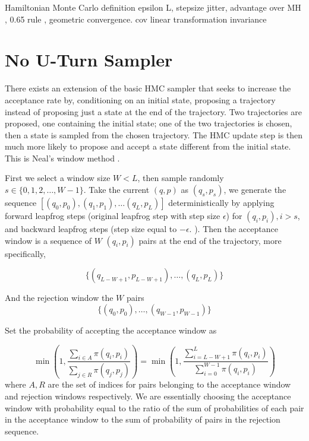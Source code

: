 \documentclass[]{report}
\begin{document}
Hamiltonian Monte Carlo 
definition epsilon L, stepsize jitter, advantage over MH , 0.65 rule , geometric convergence. cov linear transformation invariance 


\section{No U-Turn Sampler}


There exists an extension of the basic HMC sampler that seeks to increase the acceptance
rate by, conditioning on an initial state, proposing a trajectory instead of proposing just a state at the end
of the trajectory. Two trajectories are proposed, one containing the initial state; one
of the two trajectories is chosen, then a state is sampled from the chosen
trajectory. The HMC update step is then much more likely to propose and accept
a state different from the initial state. This is Neal's window
method \cite{neal1992improved}. 

First we select a window size $W < L$, then sample randomly $s \in \{0, 1,2 , \dots , W -1 \}$. Take the current $(q,p)$ as $(q_s, p_s)$, we generate the sequence $[(q_0,p_0),(q_1, p_1), \dots (q_L,p_L)]$ deterministically by applying forward leapfrog steps (original leapfrog step with step size $\epsilon$) for $(q_i,p_i), i > s $, and backward leapfrog steps (step size equal to $-\epsilon$. ). 
Then the acceptance window is a sequence of $W$ $(q_i,p_i)$ pairs at the end of the trajectory, more specifically,

\[ \{(q_{L-W+1},p_{L-W+1}), \dots , (q_L,p_L)\} \]

And the rejection window the $W$ pairs 
\[ \{(q_0,p_0), \dots, (q_{W-1},p_{W-1})\} \]

Set the probability of accepting the acceptance window as 

\[ \min (1, \frac{\sum_{i\in A} \pi(q_i,p_i)}{\sum_{j \in R} \pi(q_j,p_j) }) = \min (1, \frac{\sum_{i=L-W+1}^L \pi(q_i,p_i)}{\sum_{i=0}^{W-1}\pi(q_i,p_i)}) \]
where $A,R$ are the set of indices for pairs belonging to the acceptance window and rejection windows respectively. We are essentially choosing the acceptance window with probability equal to the ratio of the sum of probabilities of each pair in the acceptance window to the sum of probability of pairs in the rejection sequence. 
\end{document}
